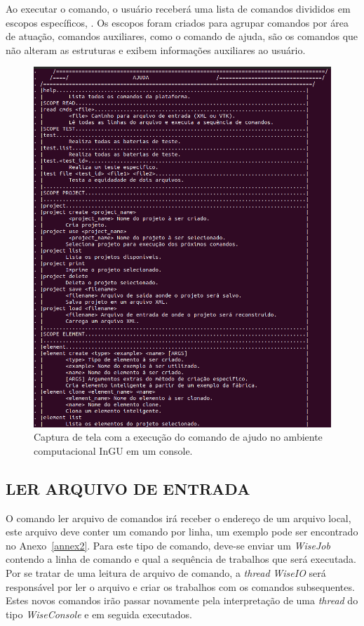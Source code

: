 Ao executar o comando, o usuário receberá uma lista de comandos divididos em escopos específicos, . Os escopos foram criados para agrupar comandos por área de atuação, comandos auxiliares, como o comando de ajuda, são os comandos que não alteram as estruturas e exibem informações auxiliares ao usuário.


\begin{figure}[!htbp]
	\centering
	\includegraphics[scale=0.45]{Figures/InGU_help.png}
	\caption{Captura de tela com a execução do comando de ajudo no ambiente computacional InGU em um console.}
	\label{fig10:ajuda}
\end{figure}


\subsection{LER ARQUIVO DE ENTRADA}\label{sec:read_cmds}


O comando ler arquivo de comandos irá receber o endereço de um arquivo local, este arquivo deve conter um comando por linha, um exemplo pode ser encontrado no Anexo~\ref{annex2}. Para este tipo de comando, deve-se enviar um \textit{WiseJob} contendo a linha de comando e qual a sequência de trabalhos que será executada. Por se tratar de uma leitura de arquivo de comando, a \textit{thread} \textit{WiseIO} será responsável por ler o arquivo e criar os trabalhos com os comandos subsequentes. Estes novos comandos irão passar novamente pela interpretação de uma \textit{thread} do tipo \textit{WiseConsole} e em seguida executados.

